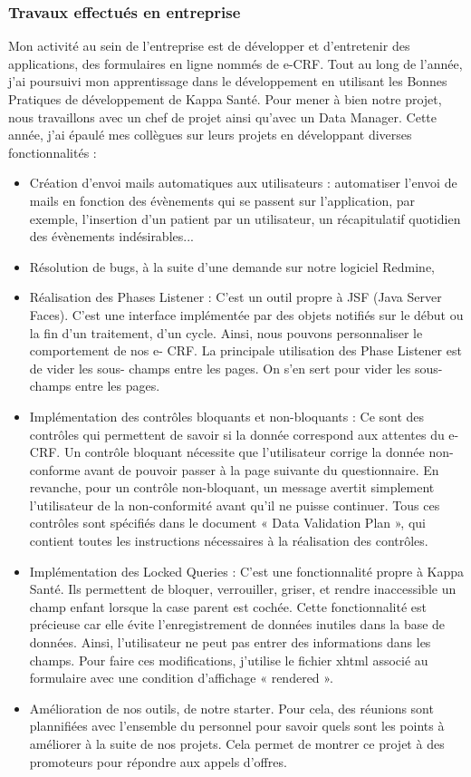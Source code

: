 \subsubsection{Travaux effectués en entreprise}
Mon activité au sein de l’entreprise est de développer et d’entretenir des
applications, des
formulaires en ligne nommés de e-CRF.
Tout au long de l’année, j’ai poursuivi mon apprentissage dans le
développement en utilisant les Bonnes Pratiques de développement de Kappa
Santé.
Pour mener à bien notre projet, nous travaillons avec un chef de projet ainsi
qu’avec un Data Manager.
Cette année, j’ai épaulé mes collègues sur leurs projets en développant
diverses fonctionnalités :
\begin{itemize}
    \item Création d’envoi mails automatiques aux utilisateurs : automatiser l’envoi
    de mails en fonction des évènements qui se passent sur l’application, par
    exemple, l’insertion d’un
    patient par un utilisateur, un récapitulatif quotidien des évènements
    indésirables...
    \item Résolution de bugs, à la suite d’une demande sur notre logiciel Redmine,
    \item Réalisation des Phases Listener : C’est un outil propre à JSF (Java Server
    Faces). C’est une interface implémentée par des objets notifiés sur le début
    ou la fin d’un traitement,
    d’un cycle. Ainsi, nous pouvons personnaliser le comportement de nos e-
    CRF. La principale utilisation des Phase Listener est de vider les sous-
    champs entre les pages. On s’en sert pour vider les sous-champs entre les
    pages.
    \item Implémentation des contrôles bloquants et non-bloquants : Ce sont des
    contrôles qui permettent de savoir si la donnée correspond aux attentes du
    e-CRF. Un contrôle bloquant nécessite que l’utilisateur corrige la donnée non-conforme avant
    de pouvoir passer à la page suivante du questionnaire. En revanche, pour
    un contrôle non-bloquant, un message avertit simplement l’utilisateur de la
    non-conformité avant qu’il ne puisse continuer. Tous ces contrôles sont spécifiés dans le document « Data Validation Plan », qui contient toutes les
    instructions nécessaires à la réalisation des contrôles.
    \item Implémentation des Locked Queries : C’est une fonctionnalité propre à
    Kappa Santé. Ils permettent de bloquer, verrouiller, griser, et rendre
    inaccessible un champ enfant
    lorsque la case parent est cochée. Cette fonctionnalité est précieuse car
    elle évite l’enregistrement de données inutiles dans la base de données.
    Ainsi, l’utilisateur ne peut
    pas entrer des informations dans les champs. Pour faire ces modifications,
    j’utilise le fichier xhtml associé au formulaire avec une condition d’affichage
    « rendered ».
    \item Amélioration de nos outils, de notre starter. Pour cela, des réunions sont plannifiées avec l'ensemble du personnel pour savoir quels sont les points à améliorer à la suite de nos projets. Cela permet de montrer ce projet à des promoteurs pour répondre aux appels d'offres.
\end{itemize}


